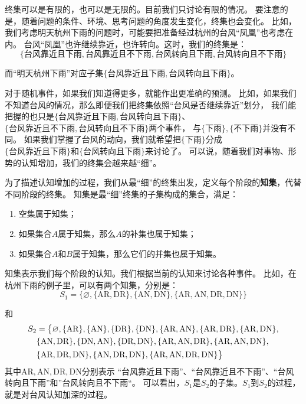 \documentclass[12pt,UTF8]{ctexbook}
\begin{document}
终集可以是有限的，也可以是无限的。目前我们只讨论有限的情况。
要注意的是，随着问题的条件、环境、思考问题的角度发生变化，终集也会变化。
比如，我们考虑明天杭州下雨的问题时，可能要把准备经过杭州的台风“凤凰”也考虑在内。
台风“凤凰”也许继续靠近，也许转向。这时，我们的终集是：
$$\{\mbox{台风靠近且下雨}, \mbox{台风靠近且不下雨}, \mbox{台风转向且下雨}, \mbox{台风转向且不下雨}\}$$

而“明天杭州下雨”对应子集$\{\mbox{台风靠近且下雨}, \mbox{台风转向且下雨}\}$。

对于随机事件，如果我们知道得更多，就能作出更准确的预测。
比如，如果我们不知道台风的情况，那么即便我们把终集依照“台风是否继续靠近”划分，
我们能把握的也只是$\{\mbox{台风靠近且下雨}, \mbox{台风转向且下雨}\}$、
$\{\mbox{台风靠近且不下雨}, \mbox{台风转向且不下雨}\}$两个事件，
与$\{\mbox{下雨}\}, \{\mbox{不下雨}\}$并没有不同。
如果我们掌握了台风的动向，我们就希望把$\{\mbox{下雨}\}$分成\\   
$\{\mbox{台风靠近且下雨}\}$和$\{\mbox{台风转向且下雨}\}$来讨论了。
可以说，随着我们对事物、形势的认知增加，我们的终集会越来越“细”。

为了描述认知增加的过程，我们从最“细”的终集出发，定义每个阶段的\textbf{知集}，代替不同阶段的终集。
知集是最“细”终集的子集构成的集合，满足：

\begin{enumerate}
    \item 空集属于知集；
    \item 如果集合$A$属于知集，那么$A$的补集也属于知集；
    \item 如果集合$A$和$B$属于知集，那么它们的并集也属于知集。
\end{enumerate}

知集表示我们每个阶段的认知。我们根据当前的认知来讨论各种事件。
比如，在杭州下雨的例子里，可以有两个知集，分别是：
$$ S_1 = \big\{\varnothing, \{\mbox{AR}, \mbox{DR}\},\{\mbox{AN}, \mbox{DN}\}, \{\mbox{AR}, \mbox{AN}, \mbox{DR}, \mbox{DN}\} \big\}$$

和
\begin{align}
    S_2 &= \big\{ \varnothing, \{\mbox{AR}\}, \{\mbox{AN}\}, \{\mbox{DR}\}, \{\mbox{DN}\}, \{\mbox{AR}, \mbox{AN}\}, \{\mbox{AR}, \mbox{DR}\}, \{\mbox{AR}, \mbox{DN}\}, \notag \\
    & \{\mbox{AN}, \mbox{DR}\}, \{\mbox{DN}, \mbox{AN}\}, \{\mbox{DR}, \mbox{DN}\},  \{\mbox{AR}, \mbox{AN}, \mbox{DR}\}, \{\mbox{AR}, \mbox{AN}, \mbox{DN}\}, \notag \\
    &  \{\mbox{AR}, \mbox{DR}, \mbox{DN}\},  \{\mbox{AN}, \mbox{DR}, \mbox{DN}\}, \{\mbox{AR}, \mbox{AN}, \mbox{DR}, \mbox{DN}\} \big\} \notag 
\end{align}
其中$\mbox{AR}, \mbox{AN}, \mbox{DR}, \mbox{DN}$分别表示
“台风靠近且下雨”、“台风靠近且不下雨”、“台风转向且下雨”和”台风转向且不下雨“。
可以看出，$S_1$是$S_2$的子集。$S_1$到$S_2$的过程，就是对台风认知加深的过程。
\end{document}
